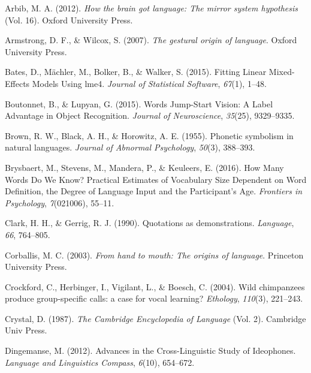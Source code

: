 \documentclass[english,floatsintext,man]{apa6}
\theoremstyle{definition}
\theoremstyle{definition}
\theoremstyle{definition}
\theoremstyle{remark}
\begin{document}
\setlength{\parindent}{-0.5in}\setlength{\leftskip}{0.5in}

\hypertarget{refs}{}
\leavevmode\hypertarget{ref-Arbib:2012htb}{}%
Arbib, M. A. (2012). \emph{How the brain got language: The mirror system
hypothesis} (Vol. 16). Oxford University Press.

\leavevmode\hypertarget{ref-Armstrong:2007go}{}%
Armstrong, D. F., \& Wilcox, S. (2007). \emph{The gestural origin of
language}. Oxford University Press.

\leavevmode\hypertarget{ref-lme4:2015}{}%
Bates, D., Mächler, M., Bolker, B., \& Walker, S. (2015). Fitting Linear
Mixed-Effects Models Using lme4. \emph{Journal of Statistical Software},
\emph{67}(1), 1--48.

\leavevmode\hypertarget{ref-Boutonnet:2015fz}{}%
Boutonnet, B., \& Lupyan, G. (2015). Words Jump-Start Vision: A Label
Advantage in Object Recognition. \emph{Journal of Neuroscience},
\emph{35}(25), 9329--9335.

\leavevmode\hypertarget{ref-Brown:1955wy}{}%
Brown, R. W., Black, A. H., \& Horowitz, A. E. (1955). Phonetic
symbolism in natural languages. \emph{Journal of Abnormal Psychology},
\emph{50}(3), 388--393.

\leavevmode\hypertarget{ref-Brysbaert:2016fg}{}%
Brysbaert, M., Stevens, M., Mandera, P., \& Keuleers, E. (2016). How
Many Words Do We Know? Practical Estimates of Vocabulary Size Dependent
on Word Definition, the Degree of Language Input and the Participant's
Age. \emph{Frontiers in Psychology}, \emph{7}(021006), 55--11.

\leavevmode\hypertarget{ref-Clark:1990cl}{}%
Clark, H. H., \& Gerrig, R. J. (1990). Quotations as demonstrations.
\emph{Language}, \emph{66}, 764--805.

\leavevmode\hypertarget{ref-Corballis:2003ha}{}%
Corballis, M. C. (2003). \emph{From hand to mouth: The origins of
language}. Princeton University Press.

\leavevmode\hypertarget{ref-Crockford:2004cz}{}%
Crockford, C., Herbinger, I., Vigilant, L., \& Boesch, C. (2004). Wild
chimpanzees produce group-specific calls: a case for vocal learning?
\emph{Ethology}, \emph{110}(3), 221--243.

\leavevmode\hypertarget{ref-Crystal:1987en}{}%
Crystal, D. (1987). \emph{The Cambridge Encyclopedia of Language} (Vol.
2). Cambridge Univ Press.

\leavevmode\hypertarget{ref-Dingemanse:2012fc}{}%
Dingemanse, M. (2012). Advances in the Cross-Linguistic Study of
Ideophones. \emph{Language and Linguistics Compass}, \emph{6}(10),
654--672.
\end{document}
